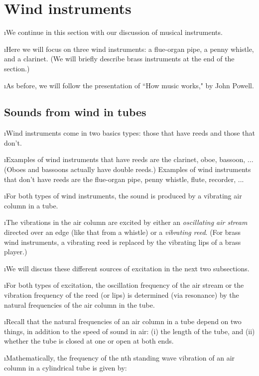 \section{Wind instruments}
\bi

\i We continue in this section with our discussion 
of musical instruments.

\i Here we will focus on three wind instruments:
a flue-organ pipe, a penny whistle, and a clarinet.
(We will briefly describe brass instruments at the end 
of the section.)

\i As before, we will follow the presentation of ``How music works,"
by John Powell.

\ei
\subsection{Sounds from wind in tubes}
\bi

\i Wind instruments come in two basics types:
those that have reeds and those that don't.

\i Examples of wind instruments that have reeds 
are the clarinet, oboe, bassoon, ...
(Oboes and bassoons actually have double reeds.)
Examples of wind instruments that don't have reeds
are the flue-organ pipe, penny whistle, flute, recorder, ...

\i For both types of wind instruments, the
sound is produced by a vibrating air column 
in a tube.

\i The vibrations in the air column are 
excited by either an
{\em oscillating air stream} directed over an
edge (like that from a whistle) or a 
{\em vibrating reed}.
(For brass wind instruments, a vibrating reed
is replaced by the vibrating lips of a brass player.)

\i We will discuss these different sources of
excitation in the next two subsections.

\i For both types of excitation, the oscillation 
frequency of the air stream or the vibration
frequency of the reed (or lips) 
is determined (via resonance) by
the natural frequencies of the air column in the tube.  

\i Recall that the natural frequencies of an
air column in a tube depend on two things, 
in addition to the speed of sound in air:
(i) the length of the tube, and 
(ii) whether the tube 
is closed at one or open at both ends.

\i Mathematically, the frequency of the nth 
standing wave vibration of an air column
in a cylindrical tube is given by:


